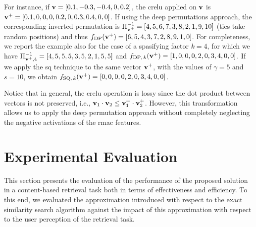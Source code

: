For instance, if $\mathbf{v} = [0.1, -0.3, -0.4, 0, 0.2]$, the \gls{crelu} applied on $\mathbf{v}$ is $\mathbf{v}^+ = [0.1, 0, 0, 0, 0.2, 0, 0.3, 0.4, 0, 0]$.
If using the deep permutations approach, the corresponding inverted permutation is $\Pi^{-1}_{\mathbf{v}^+} = [4, 5, 6, 7, 3, 8, 2, 1, 9, 10]$ (ties take random positions) and thus $f_\text{DP}(\mathbf{v}^+) = [6, 5, 4, 3, 7, 2, 8, 9, 1, 0]$.
For completeness, we report the example also for the case of a spasifying factor $k=4$, for which we have $\Pi^{-1}_{\mathbf{v}^+,4} = [4, 5, 5, 5, 3, 5, 2, 1, 5, 5]$ and $f_{\text{DP},\, k}(\mathbf{v}^+) = [1, 0, 0, 0, 2, 0, 3, 4, 0, 0]$.
If we apply the \gls{sq} technique to the same vector $\mathbf{v}^+$, with the values of $\gamma = 5$ and $s=10$, we obtain $f_{\text{SQ}, \, k}(\mathbf{v}^+) = [0, 0, 0, 0, 2, 0, 3, 4, 0, 0]$.

Notice that in general, the \gls{crelu} operation is lossy since the dot product between vectors is not preserved, i.e., $\mathbf{v}_1 \cdot \mathbf{v}_2 \leq \mathbf{v}_1^+ \cdot \mathbf{v}_2^+$.
However, this transformation allows us to apply the deep permutation approach without completely neglecting the negative activations of the \gls{rmac} features.

\section{Experimental Evaluation}
\label{sec:str:experiments}

This section presents the evaluation of the performance of the proposed solution in a content-based retrieval task both in terms of effectiveness and efficiency.
To this end, we evaluated the approximation introduced with respect to the exact similarity search algorithm against the impact of this approximation with respect to the user perception of the retrieval task.

